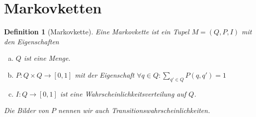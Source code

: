 \documentclass[a4paper]{article}
\newtheorem{definition}[satz]{Definition} %
\theoremstyle{nonumberplain}
\begin{document}
\section{Markovketten}

\newcommand{\mc}{Markovkette}
\newcommand{\mcex}{$M = (Q, P, I)$}
\begin{definition}[\mc]\label{def-mc}
	Eine \mc{} ist ein Tupel \mcex{} mit den Eigenschaften
	\begin{enumerate}[(a)]
		\item $Q$ ist eine Menge.
		\item $P : Q \times Q \to [0,1]$ mit der Eigenschaft $\forall q \in Q : \sum_{q' \in Q}{P(q,q') = 1}$
		\item $I : Q \to [0,1]$ ist eine Wahrscheinlichkeitsverteilung auf $Q$.
	\end{enumerate}	
	Die Bilder von $P$ nennen wir auch Transitionswahrscheinlichkeiten.
\end{definition}
\end{document}
